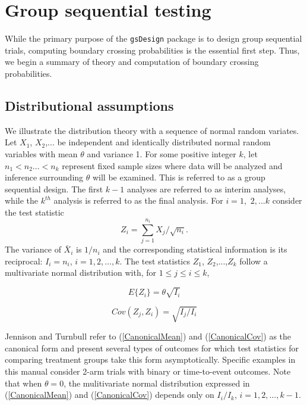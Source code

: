 \section{Group sequential testing\label{sec:testing}} 
While the primary purpose of the \texttt{gsDesign} package is to design group sequential trials, computing boundary crossing probabilities is the essential first step. Thus, we begin a summary of theory and computation of boundary crossing probabilities. 
\subsection{Distributional assumptions\label{sec:assumptions}}
We illustrate the distribution theory with a sequence of normal random
variates. Let $X_{1}$, $X_{2}$,... be independent and identically distributed normal random variables with mean $\theta$ and variance 1. For some positive integer $k$, let $n_{1}<n_{2}...<n_{k}$ represent fixed sample sizes where data will be analyzed and inference surrounding $\theta$ will be examined. This is referred to as a group sequential design. The first $k-1$ analyses are referred to as interim analyses, while the $k^{th}$ analysis is referred to as the final analysis.
For $i=1,$ $2,...k$ consider the test statistic
\[
Z_{i}=%
{\textstyle\sum\limits_{j=1}^{n_{i}}}
X_{j}/\sqrt{n_{i}}.
\]
The variance of $\bar{X}_i$ is $1/n_i$ and the corresponding statistical information is its reciprocal: $I_{i}=n_{i}$, $i=1,2,\ldots,k$. The
test statistics $Z_{1}$, $Z_{2}$,...,$Z_{k}$ follow a multivariate normal
distribution with, for $1\leq j\leq i\leq k$,

\begin{equation}
E\{Z_{i}\}=\theta\sqrt{I_{i}}\label{CanonicalMean}
\end{equation}

\begin{equation}
Cov(Z_{j},Z_{i})=\sqrt{I_{j}/I_{i}}\label{CanonicalCov}
\end{equation}

Jennison and Turnbull \cite{JTBook} refer to (\ref{CanonicalMean}) and
(\ref{CanonicalCov}) as the canonical form and present several types of
outcomes for which test statistics
for comparing treatment groups take this form asymptotically. 
Specific examples in this manual consider 2-arm trials with binary or time-to-event outcomes.
Note that when $\theta=0$, the mulitivariate normal distribution expressed in (\ref{CanonicalMean}) and (\ref{CanonicalCov}) depends only on $I_i/I_k$, $i=1,2,\ldots,k-1$.

